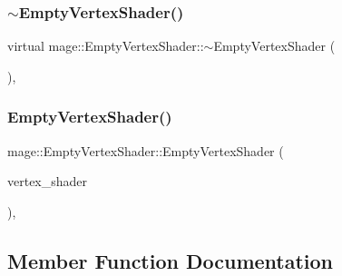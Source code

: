 \hypertarget{classmage_1_1_empty_vertex_shader_a321ef00a2087030b81713e989ab02306}{}\label{classmage_1_1_empty_vertex_shader_a321ef00a2087030b81713e989ab02306} 
\subsubsection{\texorpdfstring{$\sim$\+Empty\+Vertex\+Shader()}{~EmptyVertexShader()}}
{\footnotesize\ttfamily virtual mage\+::\+Empty\+Vertex\+Shader\+::$\sim$\+Empty\+Vertex\+Shader (\begin{DoxyParamCaption}{ }\end{DoxyParamCaption})\hspace{0.3cm}{\ttfamily [virtual]}, {\ttfamily [default]}}

\hypertarget{classmage_1_1_empty_vertex_shader_a6ab1b22d108fde8f8876e6a2e4c0decb}{}\label{classmage_1_1_empty_vertex_shader_a6ab1b22d108fde8f8876e6a2e4c0decb} 
\subsubsection{\texorpdfstring{Empty\+Vertex\+Shader()}{EmptyVertexShader()}\hspace{0.1cm}{\footnotesize\ttfamily [2/2]}}
{\footnotesize\ttfamily mage\+::\+Empty\+Vertex\+Shader\+::\+Empty\+Vertex\+Shader (\begin{DoxyParamCaption}\item[{const \hyperlink{classmage_1_1_empty_vertex_shader}{Empty\+Vertex\+Shader} \&}]{vertex\+\_\+shader }\end{DoxyParamCaption})\hspace{0.3cm}{\ttfamily [private]}, {\ttfamily [delete]}}



\subsection{Member Function Documentation}
\hypertarget{classmage_1_1_empty_vertex_shader_a2683d29127405d51737008637ebde098}{}\label{classmage_1_1_empty_vertex_shader_a2683d29127405d51737008637ebde098} 

